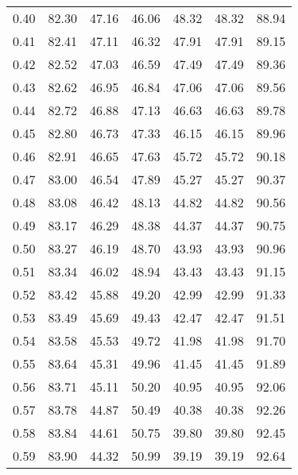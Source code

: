 \begin{tabular}{|c|c|c|c|c|c|c|}
      0.40 &     82.30 &     47.16 &      46.06 &   48.32 &      48.32 &         88.94 \\
      0.41 &     82.41 &     47.11 &      46.32 &   47.91 &      47.91 &         89.15 \\
      0.42 &     82.52 &     47.03 &      46.59 &   47.49 &      47.49 &         89.36 \\
      0.43 &     82.62 &     46.95 &      46.84 &   47.06 &      47.06 &         89.56 \\
      0.44 &     82.72 &     46.88 &      47.13 &   46.63 &      46.63 &         89.78 \\
      0.45 &     82.80 &     46.73 &      47.33 &   46.15 &      46.15 &         89.96 \\
      0.46 &     82.91 &     46.65 &      47.63 &   45.72 &      45.72 &         90.18 \\
      0.47 &     83.00 &     46.54 &      47.89 &   45.27 &      45.27 &         90.37 \\
      0.48 &     83.08 &     46.42 &      48.13 &   44.82 &      44.82 &         90.56 \\
      0.49 &     83.17 &     46.29 &      48.38 &   44.37 &      44.37 &         90.75 \\
      0.50 &     83.27 &     46.19 &      48.70 &   43.93 &      43.93 &         90.96 \\
      0.51 &     83.34 &     46.02 &      48.94 &   43.43 &      43.43 &         91.15 \\
      0.52 &     83.42 &     45.88 &      49.20 &   42.99 &      42.99 &         91.33 \\
      0.53 &     83.49 &     45.69 &      49.43 &   42.47 &      42.47 &         91.51 \\
      0.54 &     83.58 &     45.53 &      49.72 &   41.98 &      41.98 &         91.70 \\
      0.55 &     83.64 &     45.31 &      49.96 &   41.45 &      41.45 &         91.89 \\
      0.56 &     83.71 &     45.11 &      50.20 &   40.95 &      40.95 &         92.06 \\
      0.57 &     83.78 &     44.87 &      50.49 &   40.38 &      40.38 &         92.26 \\
      0.58 &     83.84 &     44.61 &      50.75 &   39.80 &      39.80 &         92.45 \\
      0.59 &     83.90 &     44.32 &      50.99 &   39.19 &      39.19 &         92.64 \\

\end{tabular}
